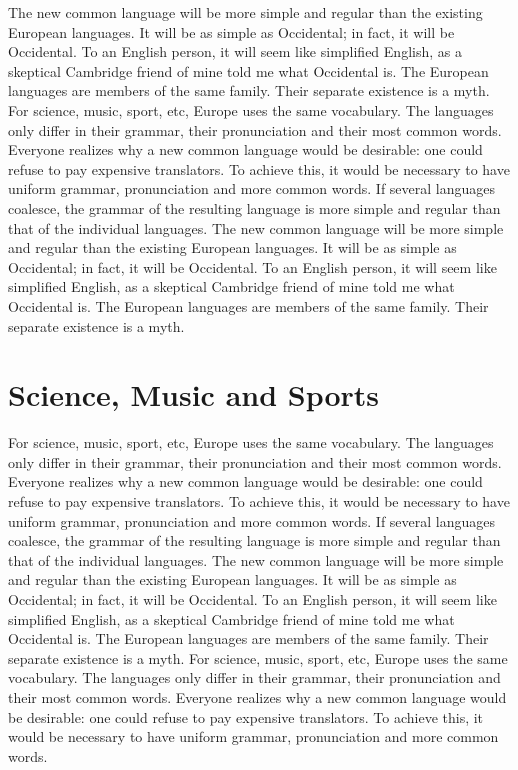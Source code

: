 The new common language will be more simple and regular than the existing European languages. It will be as simple as Occidental; in fact, it will be Occidental. To an English person, it will seem like simplified English, as a skeptical Cambridge friend of mine told me what Occidental is. The European languages are members of the same family. Their separate existence is a myth. For science, music, sport, etc, Europe uses the same vocabulary. The languages only differ in their grammar, their pronunciation and their most common words. Everyone realizes why a new common language would be desirable: one could refuse to pay expensive translators. To achieve this, it would be necessary to have uniform grammar, pronunciation and more common words. If several languages coalesce, the grammar of the resulting language is more simple and regular than that of the individual languages. The new common language will be more simple and regular than the existing European languages. It will be as simple as Occidental; in fact, it will be Occidental. To an English person, it will seem like simplified English, as a skeptical Cambridge friend of mine told me what Occidental is. The European languages are members of the same family. Their separate existence is a myth.

\section{Science, Music and Sports}
\label{sciencemusicandsports}

For science, music, sport, etc, Europe uses the same vocabulary. The languages only differ in their grammar, their pronunciation and their most common words. Everyone realizes why a new common language would be desirable: one could refuse to pay expensive translators. To achieve this, it would be necessary to have uniform grammar, pronunciation and more common words. If several languages coalesce, the grammar of the resulting language is more simple and regular than that of the individual languages. The new common language will be more simple and regular than the existing European languages. It will be as simple as Occidental; in fact, it will be Occidental. To an English person, it will seem like simplified English, as a skeptical Cambridge friend of mine told me what Occidental is. The European languages are members of the same family. Their separate existence is a myth. For science, music, sport, etc, Europe uses the same vocabulary. The languages only differ in their grammar, their pronunciation and their most common words. Everyone realizes why a new common language would be desirable: one could refuse to pay expensive translators. To achieve this, it would be necessary to have uniform grammar, pronunciation and more common words.

